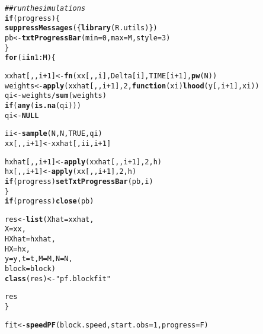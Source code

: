 \documentclass[11pt]{article}\usepackage[]{graphicx}\usepackage[]{color}
\makeatletter
\newcommand{\hlnum}[1]{\textcolor[rgb]{0.686,0.059,0.569}{#1}}%
\newcommand{\hlstr}[1]{\textcolor[rgb]{0.192,0.494,0.8}{#1}}%
\newcommand{\hlcom}[1]{\textcolor[rgb]{0.678,0.584,0.686}{\textit{#1}}}%
\newcommand{\hlopt}[1]{\textcolor[rgb]{0,0,0}{#1}}%
\newcommand{\hlstd}[1]{\textcolor[rgb]{0.345,0.345,0.345}{#1}}%
\newcommand{\hlkwa}[1]{\textcolor[rgb]{0.161,0.373,0.58}{\textbf{#1}}}%
\newcommand{\hlkwb}[1]{\textcolor[rgb]{0.69,0.353,0.396}{#1}}%
\newcommand{\hlkwc}[1]{\textcolor[rgb]{0.333,0.667,0.333}{#1}}%
\newcommand{\hlkwd}[1]{\textcolor[rgb]{0.737,0.353,0.396}{\textbf{#1}}}%
\newenvironment{kframe}{%
 \def\at@end@of@kframe{}%
 \ifinner\ifhmode%
  \def\at@end@of@kframe{\end{minipage}}%
  \begin{minipage}{\columnwidth}%
 \fi\fi%
 \def\FrameCommand##1{\hskip\@totalleftmargin \hskip-\fboxsep
 \colorbox{shadecolor}{##1}\hskip-\fboxsep
     \hskip-\linewidth \hskip-\@totalleftmargin \hskip\columnwidth}%
 \MakeFramed {\advance\hsize-\width
   \@totalleftmargin\z@ \linewidth\hsize
   \@setminipage}}%
 {\par\unskip\endMakeFramed%
 \at@end@of@kframe}
\newenvironment{knitrout}{}{} %
\makeatother
\begin{document}
\begin{knitrout}
\begin{kframe}
\begin{alltt}
    \hlcom{## run the simulations}
    \hlkwa{if} \hlstd{(progress) \{}
        \hlkwd{suppressMessages}\hlstd{(\{}\hlkwd{library}\hlstd{(R.utils)\})}
        \hlstd{pb} \hlkwb{<-} \hlkwd{txtProgressBar}\hlstd{(}\hlkwc{min} \hlstd{=} \hlnum{0}\hlstd{,} \hlkwc{max} \hlstd{= M,} \hlkwc{style} \hlstd{=} \hlnum{3}\hlstd{)}
    \hlstd{\}}
    \hlkwa{for} \hlstd{(i} \hlkwa{in} \hlnum{1}\hlopt{:}\hlstd{M) \{}

        \hlstd{xxhat[,,i}\hlopt{+}\hlnum{1}\hlstd{]} \hlkwb{<-} \hlkwd{fn}\hlstd{(xx[,,i], Delta[i], TIME[i}\hlopt{+}\hlnum{1}\hlstd{],} \hlkwd{pw}\hlstd{(N))}
        \hlstd{weights} \hlkwb{<-} \hlkwd{apply}\hlstd{(xxhat[,,i}\hlopt{+}\hlnum{1}\hlstd{],} \hlnum{2}\hlstd{,} \hlkwa{function}\hlstd{(}\hlkwc{xi}\hlstd{)} \hlkwd{lhood}\hlstd{(y[,i}\hlopt{+}\hlnum{1}\hlstd{], xi))}
        \hlstd{qi} \hlkwb{<-} \hlstd{weights} \hlopt{/} \hlkwd{sum}\hlstd{(weights)}
        \hlkwa{if} \hlstd{(}\hlkwd{any}\hlstd{(}\hlkwd{is.na}\hlstd{(qi)))}
            \hlstd{qi} \hlkwb{<-} \hlkwa{NULL}

        \hlstd{ii} \hlkwb{<-} \hlkwd{sample}\hlstd{(N, N,} \hlnum{TRUE}\hlstd{, qi)}
        \hlstd{xx[,,i}\hlopt{+}\hlnum{1}\hlstd{]} \hlkwb{<-} \hlstd{xxhat[,ii,i}\hlopt{+}\hlnum{1}\hlstd{]}

        \hlstd{hxhat[,,i}\hlopt{+}\hlnum{1}\hlstd{]} \hlkwb{<-} \hlkwd{apply}\hlstd{(xxhat[,,i}\hlopt{+}\hlnum{1}\hlstd{],} \hlnum{2}\hlstd{, h)}
        \hlstd{hx[,,i}\hlopt{+}\hlnum{1}\hlstd{]} \hlkwb{<-} \hlkwd{apply}\hlstd{(xx[,,i}\hlopt{+}\hlnum{1}\hlstd{],} \hlnum{2}\hlstd{, h)}
        \hlkwa{if} \hlstd{(progress)} \hlkwd{setTxtProgressBar}\hlstd{(pb, i)}
    \hlstd{\}}
    \hlkwa{if} \hlstd{(progress)} \hlkwd{close}\hlstd{(pb)}

    \hlstd{res} \hlkwb{<-} \hlkwd{list}\hlstd{(}\hlkwc{Xhat} \hlstd{= xxhat,}
                \hlkwc{X} \hlstd{= xx,}
                \hlkwc{HXhat} \hlstd{= hxhat,}
                \hlkwc{HX} \hlstd{= hx,}
                \hlkwc{y} \hlstd{= y,} \hlkwc{t} \hlstd{= t,} \hlkwc{M} \hlstd{= M,} \hlkwc{N} \hlstd{= N,}
                \hlkwc{block} \hlstd{= block)}
    \hlkwd{class}\hlstd{(res)} \hlkwb{<-} \hlstr{"pf.blockfit"}

    \hlstd{res}
\hlstd{\}}


\hlstd{fit} \hlkwb{<-} \hlkwd{speedPF}\hlstd{(block.speed,} \hlkwc{start.obs} \hlstd{=} \hlnum{1}\hlstd{,} \hlkwc{progress}\hlstd{=F)}
\end{alltt}
\end{kframe}
\end{knitrout}
\end{document}
